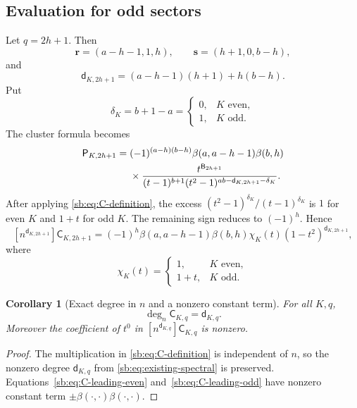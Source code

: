 \documentclass[11pt]{article}
\newtheorem{corollary}[theorem]{Corollary}
\theoremstyle{definition}
\theoremstyle{remark}
\newcommand{\Cblock}{\mathsf C}
\newcommand{\Pblock}{\mathsf P}
\newcommand{\Btri}{\mathsf B}
\newcommand{\dq}{\mathsf d}
\theoremstyle{definition}
\theoremstyle{plain}
\numberwithin{equation}{section}
\begin{document}
\subsection{Evaluation for odd sectors}
Let $q=2h+1$.  Then
\begin{equation}
 \boldsymbol r=(a-h-1,1,h),
 \qquad
 \boldsymbol s=(h+1,0,b-h),
 \label{sb:eq:odd-allocation}
\end{equation}
and
\begin{equation}
 \dq_{K,2h+1}=(a-h-1)(h+1)+h(b-h).
 \label{sb:eq:odd-d}
\end{equation}
Put
\begin{equation}
 \delta_K=b+1-a=
 \begin{cases}0,&K\text{ even},\\1,&K\text{ odd}.
 \end{cases}
 \label{sb:eq:delta-parity}
\end{equation}
The cluster formula becomes
\begin{align}
 [n^{\dq_{K,2h+1}}]\Pblock_{K,2h+1}
 ={}&(-1)^{(a-h)(b-h)}
 \beta(a,a-h-1)\beta(b,h)\notag\\
 &\times
 \frac{t^{\Btri_{2h+1}}}
 {(t-1)^{b+1}(t^2-1)^{ab-\dq_{K,2h+1}-\delta_K}}.
 \label{sb:eq:P-leading-odd}
\end{align}
After applying \eqref{sb:eq:C-definition}, the excess
$(t^2-1)^{\delta_K}/(t-1)^{\delta_K}$ is $1$ for even $K$ and $1+t$ for odd
$K$.  The remaining sign reduces to $(-1)^h$.  Hence
\begin{equation}
 \boxed{\displaystyle
 [n^{\dq_{K,2h+1}}]\Cblock_{K,2h+1}
 =(-1)^h\beta(a,a-h-1)\beta(b,h)
 \chi_K(t)(1-t^2)^{\dq_{K,2h+1}},}
 \label{sb:eq:C-leading-odd}
\end{equation}
where
\begin{equation}
 \chi_K(t)=\begin{cases}1,&K\text{ even},\\1+t,&K\text{ odd}.
 \end{cases}
 \label{sb:eq:chi}
\end{equation}

\begin{corollary}[Exact degree in $n$ and a nonzero constant term]
\label{sb:cor:n-degree}
For all $K,q$,
\[
 \deg_n\Cblock_{K,q}=\dq_{K,q}.
\]
Moreover the coefficient of $t^0$ in
$[n^{\dq_{K,q}}]\Cblock_{K,q}$ is nonzero.
\end{corollary}

\begin{proof}
The multiplication in \eqref{sb:eq:C-definition} is independent of $n$, so the
nonzero degree $\dq_{K,q}$ from \eqref{sb:eq:existing-spectral} is preserved.
Equations~\eqref{sb:eq:C-leading-even} and~\eqref{sb:eq:C-leading-odd} have
nonzero constant term $\pm\beta(\cdot,\cdot)\beta(\cdot,\cdot)$.
\end{proof}
\end{document}

